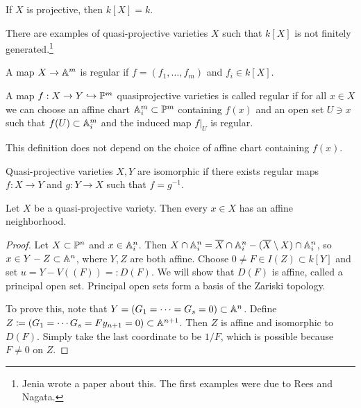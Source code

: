 \documentclass[twoside, 10pt]{article}
\begin{document}
    \begin{rmk}
        If $X$ is projective, then $k[X] = k$.
    \end{rmk}

    \begin{rmk}
        There are examples of quasi-projective varieties $X$ such that $k[X]$ is not finitely generated.\footnote{Jenia wrote a paper about this. The first examples were due to Rees and Nagata.}
    \end{rmk}

    \begin{defn}
        A map $X \to \A^m$ is regular if $f = (f_1, \ldots, f_m)$ and $f_i \in k[X]$.
    \end{defn}

    \begin{defn}
        A map $f: X \to Y \hookrightarrow \P^m$ quasiprojective varieties is called regular if for all $x \in X$ we can choose an affine chart $\A_i^m \subset \P^m$ containing $f(x)$ and an open set $U \ni x$ such that $f(U) \subset \A_i^m$ and the induced map $f\vert_U$ is regular.
    \end{defn}

    \begin{rmk}
        This definition does not depend on the choice of affine chart containing $f(x)$.
    \end{rmk}

    \begin{defn}
        Quasi-projective varieties $X,Y$ are isomorphic if there exists regular maps $f:X \to Y$ and $g:Y \to X$ such that $f = g^{-1}$.
    \end{defn}

    \begin{lem}
        Let $X$ be a quasi-projective variety. Then every $x \in X$ has an affine neighborhood.
        \begin{proof}
            Let $X \subset \P^n$ and $x \in \A_i^n$. Then $X \cap \A_i^n = \overline{X} \cap \A_i^n - (\overline{X}\setminus X) \cap \A_i^n$, so $x \in Y - Z \subset \A^n$, where $Y,Z$ are both affine. Choose $0 \neq F \in I(Z) \subset k[Y]$ and set $u = Y - V((F))=: D(F)$. We will show that $D(F)$ is affine, called a principal open set. Principal open sets form a basis of the Zariski topology.

            To prove this, note that $Y = (G_1 = \cdots = G_s= 0) \subset \A^n$. Define $Z \coloneqq (G_1 = \cdots G_s = Fy_{n+1} = 0) \subset \A^{n+1}$. Then $Z$ is affine and isomorphic to $D(F)$. Simply take the last coordinate to be $1/F$, which is possible because $F \neq 0$ on $Z$.
        \end{proof}
    \end{lem}
\end{document}
